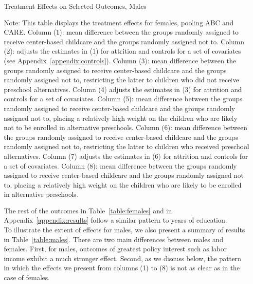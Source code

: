 \begin{table}[H] 
\begin{threeparttable}
\caption{Treatment Effects on Selected Outcomes, Males}
\label{table:males}
\centering
\scalebox{.97}{ 
}
\begin{tablenotes}
\footnotesize
\item Note: This table displays the treatment effects for females, pooling ABC and CARE. Column (1): mean difference between the groups randomly assigned to receive center-based childcare and the groups randomly assigned not to. Column (2): adjusts the estimates in (1) for attrition and controls for a set of covariates (see Appendix~\ref{appendix:controls}). Column (3): mean difference between the groups randomly assigned to receive center-based childcare and the groups randomly assigned not to, restricting the latter to children who did not receive preschool alternatives. Column (4) adjusts the estimates in (3) for attrition and controls for a set of covariates. Column (5): mean difference between the groups randomly assigned to receive center-based childcare and the groups randomly assigned not to, placing a relatively high weight on the children who are likely not to be enrolled in alternative preschools. Column (6): mean difference between the groups randomly assigned to receive center-based childcare and the groups randomly assigned not to, restricting the latter to children who received preschool alternatives. Column (7) adjusts the estimates in (6) for attrition and controls for a set of covariates. Column (8): mean difference between the groups randomly assigned to receive center-based childcare and the groups randomly assigned not to, placing a relatively high weight on the children who are likely to be enrolled in alternative preschools.
\end{tablenotes}
\end{threeparttable}
\end{table}

\noindent The rest of the outcomes in Table~\ref{table:females} and in Appendix~\ref{appendix:results} follow a similar pattern to years of education.\\

\noindent To illustrate the extent of effects for males, we also present a summary of results in Table~\ref{table:males}. There are two main differences between males and females. First, for males, outcomes of greatest policy interest such as labor income exhibit a much stronger effect. Second, as we discuss below, the pattern in which the effects we present from columns (1) to (8) is not as clear as in the case of females.\\

